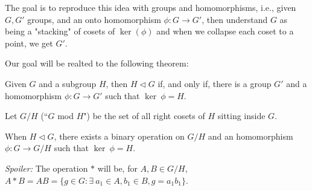 The goal is to reproduce this idea with groups and homomorphisms, i.e., given $G, G'$ groups, and an onto homomorphism  $\phi: G \to G'$, then understand $G$ as being a "stacking" of cosets of $\ker(\phi)$ and when we collapse each coset to a point, we get $G'$.

Our goal will be realted to the following theorem:

\begin{thm}
	Given $G$ and a subgroup $H$, then $H \vartriangleleft G$ if, and only if, there is a group $G'$ and a homomorphism  $\phi: G \to G'$ such that  $\ker\ \phi = H$. 
\end{thm}

\begin{defn}[Notation]
	Let $G/H$ (``$G$ mod  $H$") be the set of all right cosets of $H$ sitting inside $G$.
\end{defn}

\begin{thm}
	When $H \vartriangleleft G$, there exists a binary operation on $G/H$ and an homomorphism $\phi: G \to G/H$ such that $\ker\ \phi = H$.
\end{thm}

\textit{Spoiler:} The operation $*$ will be, for $A, B \in G/H$, $A*B = AB = \{g \in G : \exists\ a_1 \in A, b_1 \in B, g = a_1b_1\}$.
